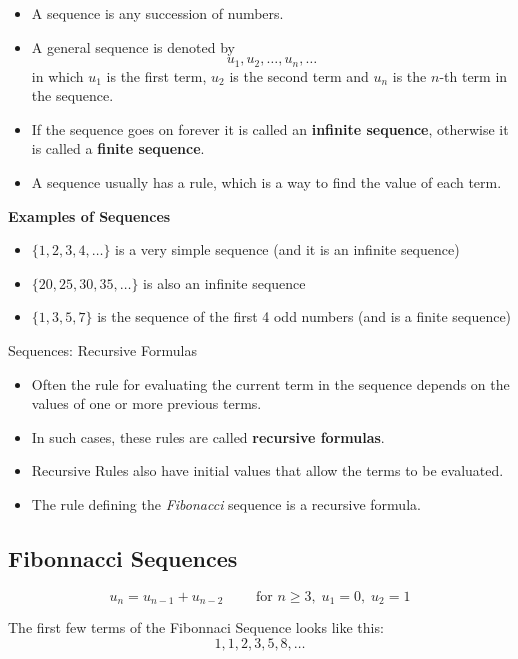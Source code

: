 

\begin{itemize}
\item A sequence is any succession of numbers. 
\item A general sequence is denoted by
\[ u_1, u_2, \ldots , u_n, \ldots \]
in which $u_1$ is the first term, $u_2$ is the second term and $u_n$ is the $n$-th 
term in the sequence.
\item If the sequence goes on forever it is called an \textbf{infinite sequence},
otherwise it is called a \textbf{finite sequence}.
\item A sequence usually has a rule, which is a way to find the value of each term.
\end{itemize}


\textbf{Examples of Sequences}
\begin{itemize}
\item $\{1, 2, 3, 4 ,\ldots\}$ is a very simple sequence (and it is an infinite sequence)
\item $\{20, 25, 30, 35, \ldots \}$ is also an infinite sequence
\item $\{1, 3, 5, 7\}$ is the sequence of the first 4 odd numbers (and is a finite sequence)
\end{itemize}


{Sequences: Recursive Formulas}
\begin{itemize}
\item Often the rule for evaluating the current term in the sequence depends on the values of one or more previous terms.
\item In such cases, these rules are called \textbf{recursive formulas}.
\item Recursive Rules also have initial values that allow the terms to be evaluated.
\item The rule defining the \textit{Fibonacci} sequence is a recursive formula.
\end{itemize}


\subsection{Fibonnacci Sequences}



\[ u_n = u_{n-1} + u_{n-2} \qquad \mbox{ for } n \geq 3 ,\; u_1=0,\;u_2=1 \]


The first few terms of the Fibonnaci Sequence looks like this:
\[ 1, 1, 2, 3, 5, 8, \ldots\]



